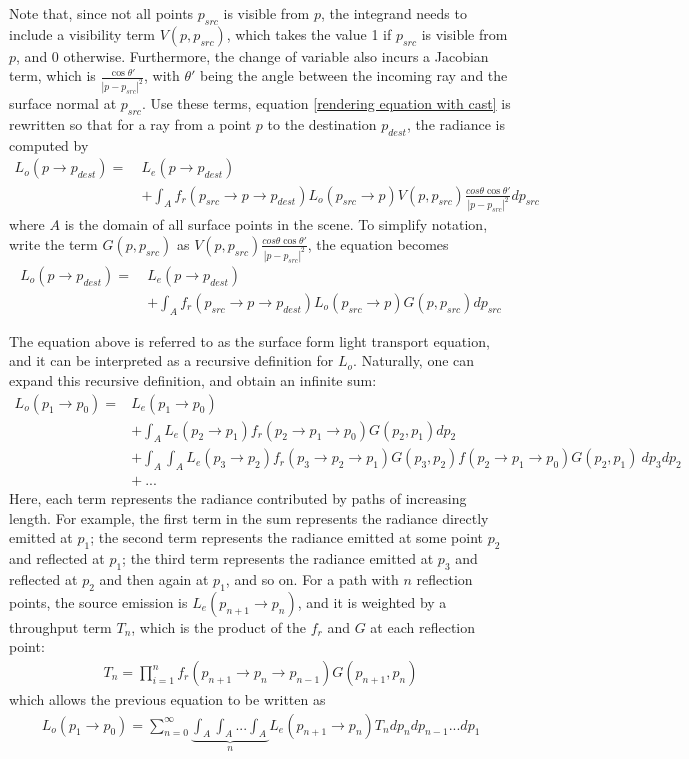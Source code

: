 Note that, since not all points $p_{src}$ is visible from $p$, the integrand needs to include a visibility term $V(p,p_{src})$, which takes the value 1 if $p_{src}$ is visible from $p$, and 0 otherwise. Furthermore, the change of variable also incurs a Jacobian term, which is $\frac{\cos\theta'}{|p-p_{src}|^2}$, with $\theta'$ being the angle between the incoming ray and the surface normal at $p_{src}$. Use these terms, equation \ref{rendering equation with cast} is rewritten so that for a ray from a point $p$ to the destination $p_{dest}$, the radiance is computed by
\begin{align*}
    L_o(p\to p_{dest}) =~ &L_e(p\to p_{dest}) \\
    &+ \int_A f_r(p_{src}\to p\to p_{dest}) L_o(p_{src}\to p)  V(p,p_{src}) \frac{cos\theta\cos\theta'}{|p-p_{src}|^2} d p_{src}
\end{align*} 
where $A$ is the domain of all surface points in the scene. To simplify notation, write the term $G(p,p_{src})$ as $V(p,p_{src}) \frac{cos\theta\cos\theta'}{|p-p_{src}|^2}$, the equation becomes
\begin{align*}
    L_o(p\to p_{dest}) =~ &L_e(p\to p_{dest}) \\
    &+ \int_A f_r(p_{src}\to p\to p_{dest}) L_o(p_{src}\to p)  G(p,p_{src})  d p_{src}
\end{align*} 

The equation above is referred to as the surface form light transport equation, and it can be interpreted as a recursive definition for $L_o$. Naturally, one can expand this recursive definition, and obtain an infinite sum:
\begin{align*}
    L_o(p_1\to p_0) =
    &L_e(p_1\to p_0)\\
    &+ \int_A L_e(p_2\to p_1)f_r(p_2\to p_1\to p_0)G(p_2,p_1) dp_2\\
    &+ \int_A \int_A L_e(p_3\to p_2)f_r(p_3\to p_2\to p_1) G(p_3,p_2)f(p_2\to p_1\to p_0)G(p_2,p_1) ~ dp_3dp_2\\
    &+~...
\end{align*}
Here, each term represents the radiance contributed by paths of increasing length. For example, the first term in the sum represents the radiance directly emitted at $p_1$; the second term represents the radiance emitted at some point $p_2$ and reflected at $p_1$; the third term represents the radiance emitted at $p_3$ and reflected at $p_2$ and then again at $p_1$, and so on. For a path with $n$ reflection points, the source emission is $L_e(p_{n+1}\to p_{n})$, and it is weighted by a throughput term $T_n$, which is the product of the $f_r$ and $G$ at each reflection point:
\begin{align*}
    T_n = \prod_{i=1}^{n} f_r(p_{n+1}\to p_n\to p_{n-1})G(p_{n+1},p_n)
\end{align*}
which allows the previous equation to be written as
\begin{align*}
    L_o(p_1\to p_0) = \sum_{n=0}^{\infty} \underbrace{\int_A \int_A...\int_A}_{n} L_e(p_{n+1}\to p_{n})T_n dp_{n}dp_{n-1}...dp_1
\end{align*}

